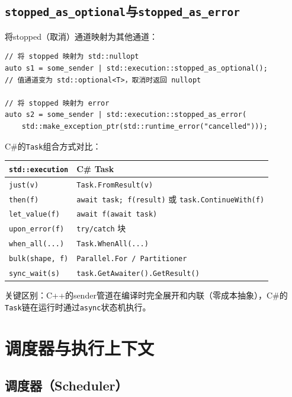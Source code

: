 \documentclass[12pt,a4paper,fontset=fandol]{ctexbook}
\newcommand{\cpp}[1]{C++#1}
\newcommand{\csharp}{C\#}
\begin{document}
\section{\texttt{stopped\_as\_optional}与\texttt{stopped\_as\_error}}

将stopped（取消）通道映射为其他通道：

\begin{lstlisting}
// 将 stopped 映射为 std::nullopt
auto s1 = some_sender | std::execution::stopped_as_optional();
// 值通道变为 std::optional<T>，取消时返回 nullopt

// 将 stopped 映射为 error
auto s2 = some_sender | std::execution::stopped_as_error(
    std::make_exception_ptr(std::runtime_error("cancelled")));
\end{lstlisting}

\begin{compare}
\csharp{}的\texttt{Task}组合方式对比：

\begin{longtable}{ll}
\toprule
\textbf{\texttt{std::execution}} & \textbf{\csharp{} Task} \\
\midrule
\texttt{just(v)} & \texttt{Task.FromResult(v)} \\
\texttt{then(f)} & \texttt{await task; f(result)} 或 \texttt{task.ContinueWith(f)} \\
\texttt{let\_value(f)} & \texttt{await f(await task)} \\
\texttt{upon\_error(f)} & \texttt{try/catch} 块 \\
\texttt{when\_all(...)} & \texttt{Task.WhenAll(...)} \\
\texttt{bulk(shape, f)} & \texttt{Parallel.For / Partitioner} \\
\texttt{sync\_wait(s)} & \texttt{task.GetAwaiter().GetResult()} \\
\bottomrule
\end{longtable}

关键区别：\cpp{}的sender管道在编译时完全展开和内联（零成本抽象），\csharp{}的\texttt{Task}链在运行时通过\texttt{async}状态机执行。
\end{compare}

\chapter{调度器与执行上下文}

\section{调度器（Scheduler）}
\end{document}
